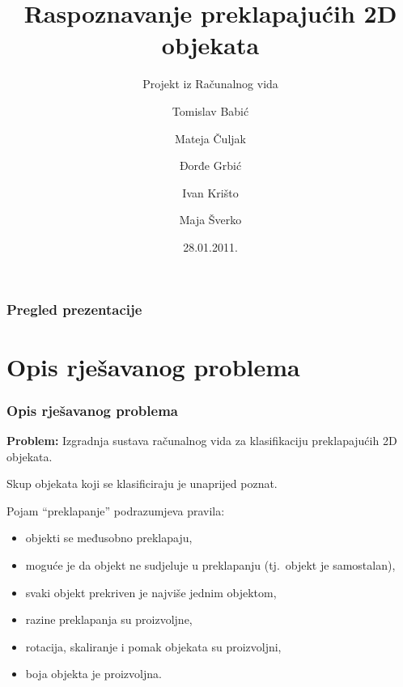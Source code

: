 \documentclass{beamer}
\title{Raspoznavanje preklapajućih 2D objekata}
\subtitle{Projekt iz Računalnog vida}
\author{Tomislav Babić \and Mateja Čuljak \and Đorđe Grbić \and Ivan Krišto \and Maja Šverko}
\institute[Universities of]
{
Fakultet Elektrotehnike i Računarstva\\
Sveučilište u Zagrebu}
\date{28.01.2011.}
\begin{document}
\begin{frame}
\titlepage
\end{frame}

\begin{frame}
\frametitle{Pregled prezentacije}
\tableofcontents
\end{frame}


\section{Opis rješavanog problema}
\begin{frame}
\frametitle{Opis rješavanog problema}
\textbf{Problem:} Izgradnja sustava računalnog vida za klasifikaciju
preklapajućih 2D objekata.

Skup objekata koji se klasificiraju je unaprijed
poznat.

\pause
\vspace{10pt}
Pojam ``preklapanje'' podrazumjeva pravila:
\begin{itemize}
  \item objekti se međusobno preklapaju,
  \item moguće je da objekt ne sudjeluje u preklapanju (tj.\ objekt je samostalan),
  \item svaki objekt prekriven je najviše jednim objektom,
  \item razine preklapanja su proizvoljne,
  \item rotacija, skaliranje i pomak objekata su proizvoljni,
  \item boja objekta je proizvoljna.
\end{itemize}
\end{frame}
\end{document}
